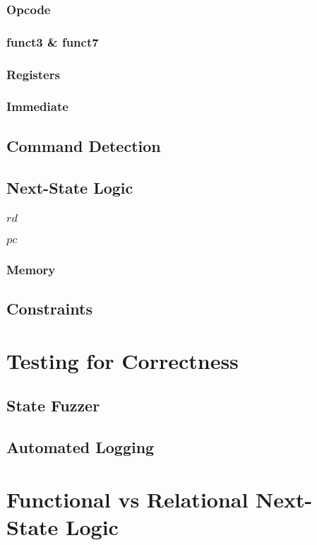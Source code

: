 \subsubsection{Opcode}
\subsubsection{funct3 \& funct7}
\subsubsection{Registers}
\subsubsection{Immediate}
\subsection{Command Detection}
\subsection{Next-State Logic}
\subsubsection{$rd$}
\subsubsection{$pc$}
\subsubsection{Memory}
\subsection{Constraints}
\section{Testing for Correctness}\label{sec:corectness}
\subsection{State Fuzzer}
\subsection{Automated Logging}

\section{Functional vs Relational Next-State Logic}\label{sec:funcVSrel}